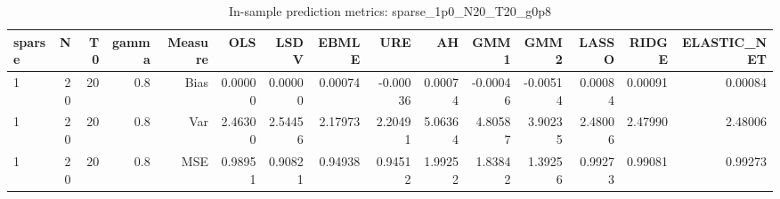 \begin{table}[!htbp]\centering
\caption{In-sample prediction metrics: sparse_1p0_N20_T20_g0p8}
\label{tab:table2_sparse_1p0_N20_T20_g0p8}
\begin{tabular}{lrrrrrrrrrrrrrr}
\hline
sparse & N & T0 & gamma & Measure & OLS & LSDV & EBMLE & URE & AH & GMM1 & GMM2 & LASSO & RIDGE & ELASTIC_NET \\
\hline
1 & 20 & 20 & 0.8 & Bias & 0.00000 & 0.00000 & 0.00074 & -0.00036 & 0.00074 & -0.00046 & -0.00514 & 0.00084 & 0.00091 & 0.00084 \\
1 & 20 & 20 & 0.8 & Var & 2.46300 & 2.54456 & 2.17973 & 2.20491 & 5.06364 & 4.80587 & 3.90235 & 2.48006 & 2.47990 & 2.48006 \\
1 & 20 & 20 & 0.8 & MSE & 0.98951 & 0.90821 & 0.94938 & 0.94512 & 1.99252 & 1.83842 & 1.39256 & 0.99273 & 0.99081 & 0.99273 \\
\hline
\end{tabular}
\end{table}

